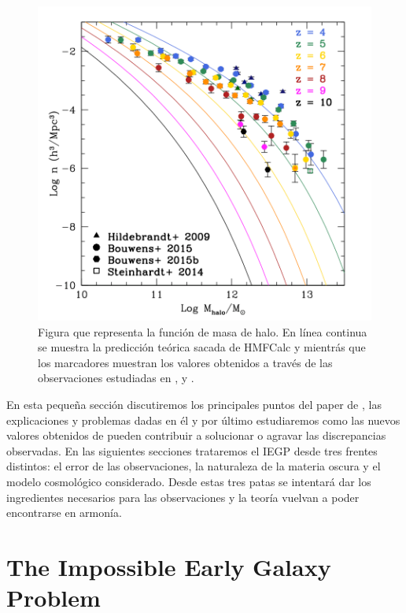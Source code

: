 \begin{figure}
	\begin{center}
		\includegraphics[scale=0.5]{Figures/steindhart_fig1}
		\caption{\label{fig:stein16_f1} Figura que representa la funci\'on de masa de halo. En l\'inea continua se muestra la predicci\'on te\'orica sacada de HMFCalc \citep{murray2013hmfcalc} y \cite{sheth2001ellipsoidal} mientr\'as que los marcadores muestran los valores obtenidos a trav\'es de las observaciones estudiadas en \cite{hildebrandt2009cars}, \cite{speagle2014highly} y \cite{bower2006breaking}.}
	\end{center}
\end{figure}

En esta pequeña sección discutiremos los principales puntos del paper de \cite{steinhardt2016impossibly}, las explicaciones y problemas dadas en él y por último estudiaremos como las nuevos valores obtenidos de \cite{behroozi2019universemachine} pueden contribuir a solucionar o agravar las discrepancias observadas. En las siguientes secciones trataremos el IEGP desde tres frentes distintos: el error de las observaciones, la naturaleza de la materia oscura y el modelo cosmológico considerado. Desde estas tres patas se intentará dar los ingredientes necesarios para las observaciones y la teoría vuelvan a poder encontrarse en armonía.


\section{The Impossible Early Galaxy Problem}